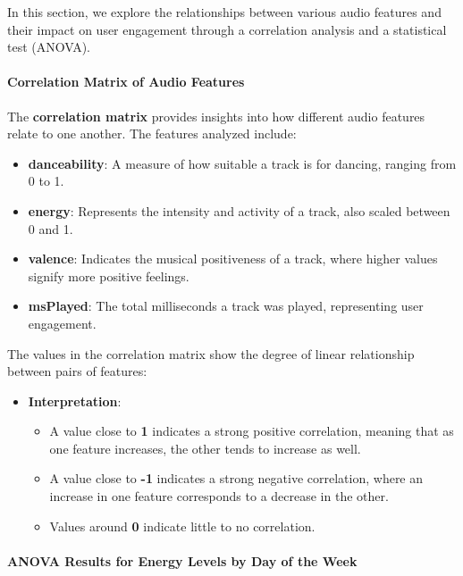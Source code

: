 \documentclass[
]{article}
\providecommand{\tightlist}{%
  \setlength{\itemsep}{0pt}\setlength{\parskip}{0pt}}
\begin{document}
In this section, we explore the relationships between various audio
features and their impact on user engagement through a correlation
analysis and a statistical test (ANOVA).

\paragraph{Correlation Matrix of Audio
Features}\label{correlation-matrix-of-audio-features}

The \textbf{correlation matrix} provides insights into how different
audio features relate to one another. The features analyzed include:

\begin{itemize}
\tightlist
\item
  \textbf{danceability}: A measure of how suitable a track is for
  dancing, ranging from 0 to 1.
\item
  \textbf{energy}: Represents the intensity and activity of a track,
  also scaled between 0 and 1.
\item
  \textbf{valence}: Indicates the musical positiveness of a track, where
  higher values signify more positive feelings.
\item
  \textbf{msPlayed}: The total milliseconds a track was played,
  representing user engagement.
\end{itemize}

The values in the correlation matrix show the degree of linear
relationship between pairs of features:

\begin{itemize}
\tightlist
\item
  \textbf{Interpretation}:

  \begin{itemize}
  \tightlist
  \item
    A value close to \textbf{1} indicates a strong positive correlation,
    meaning that as one feature increases, the other tends to increase
    as well.
  \item
    A value close to \textbf{-1} indicates a strong negative
    correlation, where an increase in one feature corresponds to a
    decrease in the other.
  \item
    Values around \textbf{0} indicate little to no correlation.
  \end{itemize}
\end{itemize}

\paragraph{ANOVA Results for Energy Levels by Day of the
Week}\label{anova-results-for-energy-levels-by-day-of-the-week}
\end{document}
